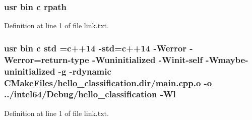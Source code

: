 \subsubsection[{\texorpdfstring{rpath}{rpath}}]{\setlength{\rightskip}{0pt plus 5cm}usr bin {\bf c} rpath}\hypertarget{hello__classification_2CMakeFiles_2hello__classification_8dir_2link_8txt_ab9d7fd7120fafa2118a4e08c1df697c7}{}\label{hello__classification_2CMakeFiles_2hello__classification_8dir_2link_8txt_ab9d7fd7120fafa2118a4e08c1df697c7}


Definition at line 1 of file link.\+txt.

\subsubsection[{\texorpdfstring{std}{std}}]{\setlength{\rightskip}{0pt plus 5cm}usr bin {\bf c} std ={\bf c}++14 -\/std={\bf c}++14 -\/Werror -\/Werror=return-\/type -\/Wuninitialized -\/Winit-\/self -\/Wmaybe-\/uninitialized -\/g -\/rdynamic C\+Make\+Files/hello\+\_\+classification.\+dir/main.\+cpp.\+o -\/o ../intel64/Debug/hello\+\_\+classification -\/{\bf Wl}}\hypertarget{hello__classification_2CMakeFiles_2hello__classification_8dir_2link_8txt_a1ccfea5f558575a112db71eeb271fabf}{}\label{hello__classification_2CMakeFiles_2hello__classification_8dir_2link_8txt_a1ccfea5f558575a112db71eeb271fabf}


Definition at line 1 of file link.\+txt.

